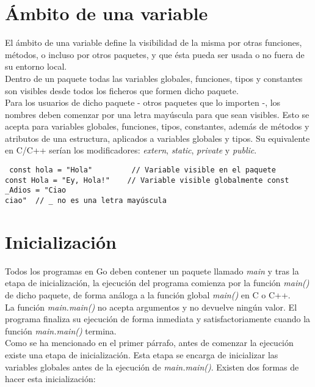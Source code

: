 \section{Ámbito de una variable}

El ámbito de una variable define la visibilidad de la misma por otras funciones,
métodos, o incluso por otros paquetes, y que ésta pueda ser usada o no fuera de
su entorno local.\\

Dentro de un paquete todas las variables globales, funciones, tipos y constantes
son visibles desde todos los ficheros que formen dicho paquete.\\

Para los usuarios de dicho paquete - otros paquetes que lo importen -, los
nombres deben comenzar por una letra mayúscula para que sean visibles. Esto se
acepta para variables globales, funciones, tipos, constantes, además de métodos
y atributos de una estructura, aplicados a variables globales y tipos. Su
equivalente en C/C++ serían los modificadores: \textit{extern}, \textit{static},
\textit{private} y \textit{public}.

\begin{verbatim} const hola = "Hola"         // Variable visible en el paquete
const Hola = "Ey, Hola!"    // Variable visible globalmente const _Adios = "Ciao
ciao"  // _ no es una letra mayúscula \end{verbatim}

\section{Inicialización}

Todos los programas en Go deben contener un paquete llamado \textit{main} y tras
la etapa de inicialización, la ejecución del programa comienza por la función
\textit{main()} de dicho paquete, de forma análoga a la función global
\textit{main()} en C o C++.\\

La función \textit{main.main()} no acepta argumentos y no devuelve ningún valor.
El programa finaliza su ejecución de forma inmediata y satisfactoriamente cuando
la función \textit{main.main()} termina.\\

Como se ha mencionado en el primer párrafo, antes de comenzar la ejecución
existe una etapa de inicialización. Esta etapa se encarga de inicializar las
variables globales antes de la ejecución de \textit{main.main()}. Existen dos
formas de hacer esta inicialización:

